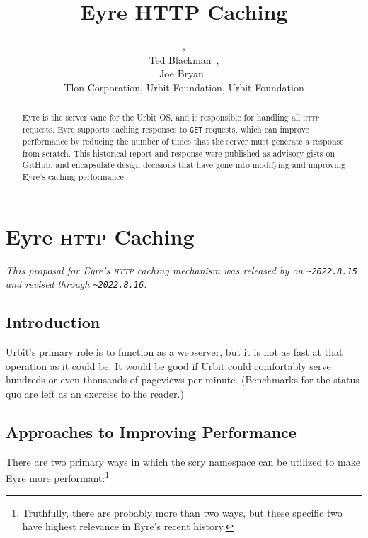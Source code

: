 \documentclass[twoside]{article}
\title{Eyre HTTP Caching}
\author{\patp{palfun-foslup}, \\ Ted Blackman~\patp{rovyns-ricfer}, \\ Joe Bryan~\patp{master-morzod} \\ Tlon Corporation, Urbit Foundation, Urbit Foundation}
\date{}
\begin{document}
\maketitle
\thispagestyle{firststyle}

\begin{abstract}
  Eyre is the server vane for the Urbit OS, and is responsible for handling all \textsc{http} requests.  Eyre supports caching responses to \texttt{GET} requests, which can improve performance by reducing the number of times that the server must generate a response from scratch.  This historical report and response were published as advisory gists on GitHub, and encapsulate design decisions that have gone into modifying and improving Eyre's caching performance.
\end{abstract}

\setcounter{page}{1}

\tableofcontents

\section{Eyre \textsc{http} Caching}

\noindent\sloppy
\emph{This proposal for Eyre's \textsc{http} caching mechanism was released by  on \texttt{\textasciitilde 2022.8.15} and revised through \texttt{\textasciitilde 2022.8.16}.}

\subsection{Introduction}

Urbit's primary role is to function as a webserver, but it is not as fast at that operation as it could be.  It would be good if Urbit could comfortably serve hundreds or even thousands of pageviews per minute.  (Benchmarks for the status quo are left as an exercise to the reader.)

\subsection{Approaches to Improving Performance}

There are two primary ways in which the scry namespace can be utilized to make Eyre more performant:\footnote{Truthfully, there are probably more than two ways, but these specific two have highest relevance in Eyre's recent history.}
\end{document}
